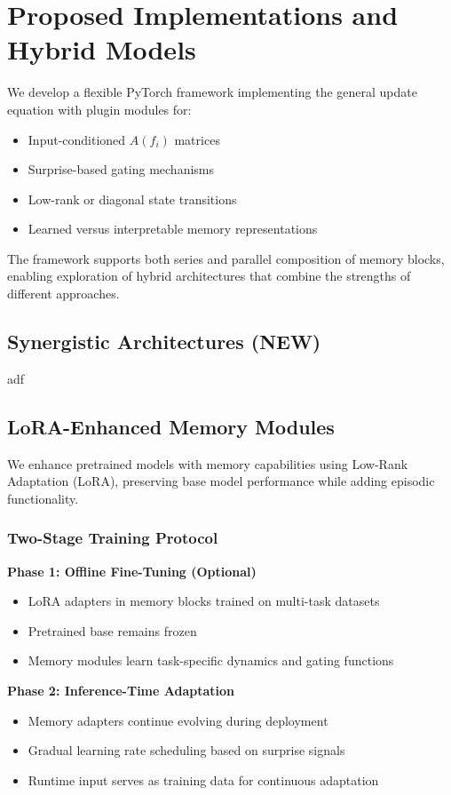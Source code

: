 \section{Proposed Implementations and Hybrid Models}
We develop a flexible PyTorch framework implementing the general update equation with plugin modules for:
\begin{itemize}
\item Input-conditioned $A(f_i)$ matrices
\item Surprise-based gating mechanisms  
\item Low-rank or diagonal state transitions
\item Learned versus interpretable memory representations
\end{itemize}

The framework supports both series and parallel composition of memory blocks, enabling exploration of hybrid architectures that combine the strengths of different approaches.


\subsection{Synergistic Architectures (NEW)} %
adf

\subsection{LoRA-Enhanced Memory Modules}
We enhance pretrained models with memory capabilities using Low-Rank Adaptation (LoRA), preserving base model performance while adding episodic functionality.

\subsubsection{Two-Stage Training Protocol}
\textbf{Phase 1: Offline Fine-Tuning (Optional)}
\begin{itemize}
\item
LoRA adapters in memory blocks trained on multi-task datasets
\item
Pretrained base remains frozen
\item
Memory modules learn task-specific dynamics and gating functions
\end{itemize}

\textbf{Phase 2: Inference-Time Adaptation}
\begin{itemize}
\item
Memory adapters continue evolving during deployment
\item
Gradual learning rate scheduling based on surprise signals
\item
Runtime input serves as training data for continuous adaptation
\end{itemize}

